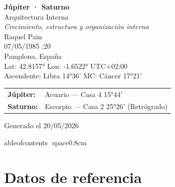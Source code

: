\documentclass[11pt,a4paper]{article}
\begin{document}

\begin{titlepage}
\centering

\vspace*{2cm}

{\Huge\bfseries\color{azulai} Júpiter · Saturno}\\[0.4cm]

{\large\color{grisai} Arquitectura Interna}\\[0.25cm]

{\small\itshape\color{grisai}
Crecimiento, estructura y organización interna
}\\[1.8cm]

{\huge\color{doradoai} Raquel Pain}\\[1.2cm]

{\Large 07/05/1985 :20}\\[0.25cm]

{\Large Pamplona, España}\\[0.25cm]

{\normalsize
Lat: 42.8157° \quad
Lon: -1.6522° \quad
UTC+02:00
}\\[0.4cm]

{\normalsize
Ascendente: Libra 14°36'
\quad
MC: Cáncer 17°21'
}\\[1.6cm]

\begin{tabular}{ll}
\textbf{Júpiter:} & Acuario — Casa 4 15°44' \\
\textbf{Saturno:} & Escorpio — Casa 2 25°26' (Retrógrado) \\
\end{tabular}

\vfill

{\small\color{grisai}
Generado el 20/05/2026
}

\end{titlepage}

	ableofcontents
space{0.8cm}


\section{Datos de referencia}
\end{document}
